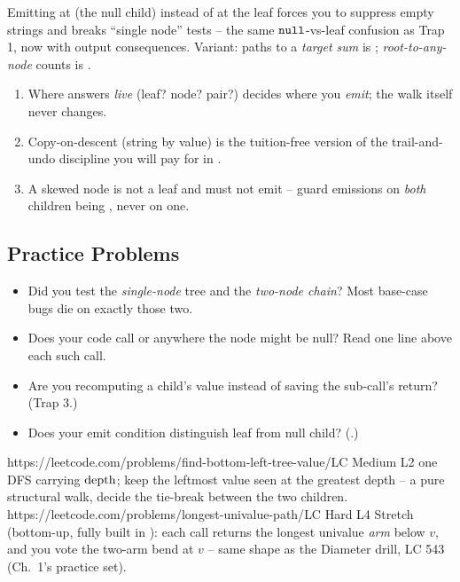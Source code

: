 \begin{warningbox}
Emitting at  (the null child) instead of at the leaf forces you to
suppress empty strings and breaks ``single node'' tests -- the same $\texttt{null}$-vs-leaf
confusion as Trap 1, now with output consequences. Variant: paths to a
\emph{target sum} is ; \emph{root-to-any-node} counts
is .
\end{warningbox}

\begin{insightbox}
\begin{enumerate}[nosep, leftmargin=1.6em]
  \item Where answers \emph{live} (leaf? node? pair?) decides where you
        \emph{emit}; the walk itself never changes.
  \item Copy-on-descent (string by value) is the tuition-free version of the
        trail-and-undo discipline you will pay for in .
  \item A skewed node is not a leaf and must not emit -- guard emissions on
        \emph{both} children being \nil{}, never on one.
\end{enumerate}
\end{insightbox}

\subsection{Practice Problems}

\begin{stuckbox}
\begin{itemize}[nosep, leftmargin=1.4em]
  \item Did you test the \emph{single-node} tree and the \emph{two-node chain}?
        Most base-case bugs die on exactly those two.
  \item Does your code call  or  anywhere the node
        might be null? Read one line above each such call.
  \item Are you recomputing a child's value instead of saving the sub-call's
        return? (Trap 3.)
  \item Does your emit condition distinguish leaf from null child?
        (.)
\end{itemize}
\end{stuckbox}

\begin{practiceset}
    {https://leetcode.com/problems/find-bottom-left-tree-value/}{LC Medium L2}
    {one DFS carrying $\operatorname{depth}$; keep the leftmost value seen at the greatest
    depth -- a pure structural walk, decide the tie-break between the two children.}
    {https://leetcode.com/problems/longest-univalue-path/}{LC Hard L4}
    {Stretch (bottom-up, fully built in ): each call returns
    the longest univalue \emph{arm} below $v$, and you vote the two-arm bend at
    $v$ -- same shape as the Diameter drill, LC 543 (Ch.~1's practice set).}
\end{practiceset}


